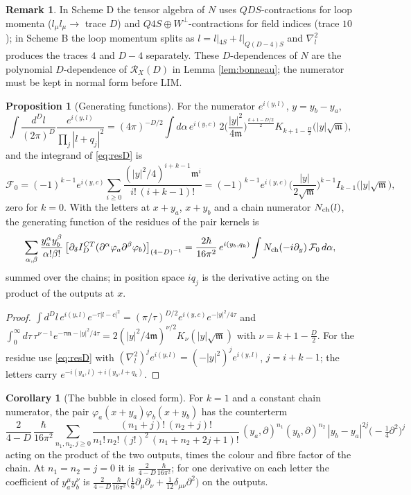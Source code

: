 \documentclass[11pt]{article}
\theoremstyle{definition}
\newtheorem{proposition}[definition]{Proposition}
\newtheorem{corollary}[definition]{Corollary}
\newtheorem{remark}[definition]{Remark}
\numberwithin{equation}{section}
\begin{document}
\begin{remark}
In Scheme D the tensor algebra of $N$ uses $QDS$-contractions for loop momenta ($l_\mu l_\mu\to$ trace $D$) and $Q4S\oplus W^\perp$-contractions for field indices (trace $10$); in Scheme B the loop momentum splits as $l=l|_{4S}+l|_{Q(D-4)S}$ and $\nabla^2_l$ produces the traces $4$ and $D-4$ separately. These $D$-dependences of $N$ are the polynomial $D$-dependence of $\mathcal R_X(D)$ in Lemma \ref{lem:bonneau}; the numerator must be kept in normal form before $\mathrm{LIM}$.
\end{remark}

\begin{proposition}[Generating functions]
\label{prop:genD}
For the numerator $e^{i(y,l)}$, $y=y_b-y_a$,
\[
\int\frac{d^Dl}{(2\pi)^D}\frac{e^{i(y,l)}}{\prod_j|l+q_j|^2}=(4\pi)^{-D/2}\int d\alpha\,e^{i(y,c)}\,2\Big(\frac{|y|^2}{4\mathfrak m}\Big)^{\frac{k+1-D/2}2}K_{k+1-\frac D2}\big(|y|\sqrt{\mathfrak m}\big),
\]
and the integrand of \eqref{eq:resD} is
\[
\mathcal F_0=(-1)^{k-1}e^{i(y,c)}\sum_{i\ge0}\frac{(|y|^2/4)^{i+k-1}\mathfrak m^i}{i!\,(i+k-1)!}=(-1)^{k-1}e^{i(y,c)}\Big(\frac{|y|}{2\sqrt{\mathfrak m}}\Big)^{k-1}I_{k-1}\big(|y|\sqrt{\mathfrak m}\big),
\]
zero for $k=0$. With the letters at $x+y_a$, $x+y_b$ and a chain numerator $N_{\rm ch}(l)$, the generating function of the residues of the pair kernels is
\[
\sum_{\alpha,\beta}\frac{y_a^\alpha y_b^\beta}{\alpha!\beta!}\,\big[\partial_\delta I^{CT}_D(\partial^\alpha\varphi_a\partial^\beta\varphi_b)\big]_{(4-D)^{-1}}=\frac{2\hbar}{16\pi^2}\,e^{i(y_b,q_k)}\int N_{\rm ch}(-i\partial_y)\,\mathcal F_0\,d\alpha,
\]
summed over the chains; in position space $iq_j$ is the derivative acting on the product of the outputs at $x$.
\end{proposition}

\begin{proof}
$\int d^Dl\,e^{i(y,l)}e^{-\tau|l-c|^2}=(\pi/\tau)^{D/2}e^{i(y,c)}e^{-|y|^2/4\tau}$ and $\int_0^\infty d\tau\,\tau^{\nu-1}e^{-\tau\mathfrak m-|y|^2/4\tau}=2(|y|^2/4\mathfrak m)^{\nu/2}K_\nu(|y|\sqrt{\mathfrak m})$ with $\nu=k+1-\frac D2$. For the residue use \eqref{eq:resD} with $(\nabla^2_l)^je^{i(y,l)}=(-|y|^2)^je^{i(y,l)}$, $j=i+k-1$; the letters carry $e^{-i(y_a,l)+i(y_b,l+q_k)}$.
\end{proof}

\begin{corollary}[The bubble in closed form]
\label{cor:bubble}
For $k=1$ and a constant chain numerator, the pair $\varphi_a(x+y_a)\varphi_b(x+y_b)$ has the counterterm
\[
\frac{2}{4-D}\,\frac{\hbar}{16\pi^2}\sum_{n_1,n_2,j\ge0}\frac{(n_1+j)!\,(n_2+j)!}{n_1!\,n_2!\,(j!)^2\,(n_1+n_2+2j+1)!}\,(y_a,\partial)^{n_1}(y_b,\partial)^{n_2}\,|y_b-y_a|^{2j}\big(-\tfrac14\partial^2\big)^j
\]
acting on the product of the two outputs, times the colour and fibre factor of the chain. At $n_1=n_2=j=0$ it is $\frac2{4-D}\frac{\hbar}{16\pi^2}$; for one derivative on each letter the coefficient of $y_a^\mu y_b^\nu$ is $\frac{2}{4-D}\frac{\hbar}{16\pi^2}\big(\frac16\partial_\mu\partial_\nu+\frac1{12}\delta_{\mu\nu}\partial^2\big)$ on the outputs.
\end{corollary}
\end{document}
